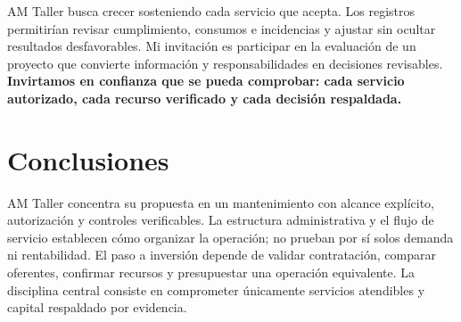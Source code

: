 {AM Taller busca crecer sosteniendo cada servicio que acepta. Los registros permitirían revisar cumplimiento, consumos e incidencias y ajustar sin ocultar resultados desfavorables. Mi invitación es participar en la evaluación de un proyecto que convierte información y responsabilidades en decisiones revisables. \textbf{Invirtamos en confianza que se pueda comprobar: cada servicio autorizado, cada recurso verificado y cada decisión respaldada.}
\section{Conclusiones}
AM Taller concentra su propuesta en un mantenimiento con alcance explícito, autorización y controles verificables. La estructura administrativa y el flujo de servicio establecen cómo organizar la operación; no prueban por sí solos demanda ni rentabilidad. El paso a inversión depende de validar contratación, comparar oferentes, confirmar recursos y presupuestar una operación equivalente. La disciplina central consiste en comprometer únicamente servicios atendibles y capital respaldado por evidencia.
}
